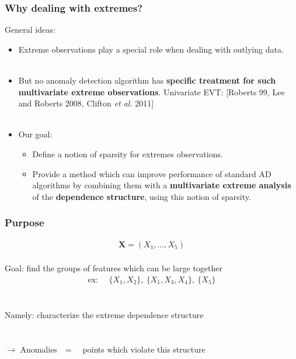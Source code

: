 \documentclass[9pt]{beamer}
\def\mb{\mathbf}
\begin{document}
\begin{frame}
\frametitle{Why dealing with extremes?}
\begin{alertblock}{General ideas:}
\begin{itemize}
\item Extreme observations play a special role when dealing with outlying data.\\~\\
\item But no anomaly detection algorithm has \textbf{specific treatment for such multivariate extreme observations}. Univariate EVT: [Roberts 99, Lee and Roberts 2008, Clifton \emph{et al.} 2011]\\~\\
\item Our goal:
  \begin{itemize}
  \item Define a notion of sparsity for extremes observations.
  \item Provide a method which can improve performance of standard AD algorithms by combining them with a \textbf{multivariate extreme analysis} of the \textbf{dependence structure}, using this notion of sparsity.
  \end{itemize}
\end{itemize}
\end{alertblock}
\end{frame}



\begin{frame}
\frametitle{Purpose}
\noindent
\begin{align*}
\mb X = (X_1,\ldots,X_5)
\end{align*}
~\\
{\large Goal: find the groups of features which can be large together}
\begin{align*}
\text{ex:~~~~}\{X_1, X_2\},~\{X_1, X_3, X_4\},~\{X_5\}
\end{align*}
~\\~\\
{\large Namely: characterize the extreme dependence structure\\~\\~\\

$\to$ Anomalies~~=~~ points which violate this structure
}
\end{frame}
\end{document}
